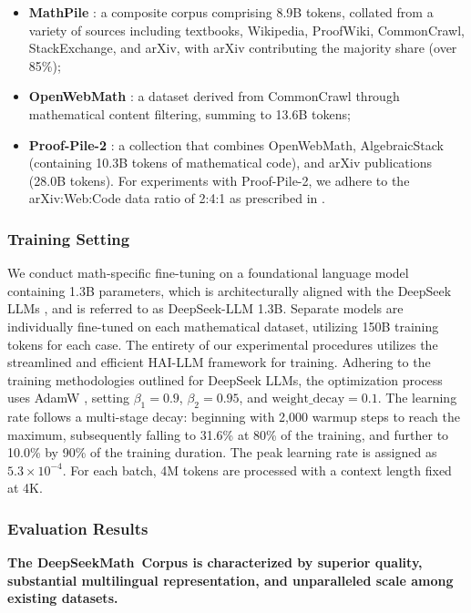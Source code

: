 \begin{itemize}[topsep=0pt]
    \item \textbf{MathPile} \citep{mathpile}: a composite corpus comprising 8.9B tokens, collated from a variety of sources including textbooks, Wikipedia, ProofWiki, CommonCrawl, StackExchange, and arXiv, with arXiv contributing the majority share (over 85\%);
    \item \textbf{OpenWebMath} \citep{openwebmath}: a dataset derived from CommonCrawl through mathematical content filtering, summing to 13.6B tokens;
    \item \textbf{Proof-Pile-2} \citep{llemma}: a collection that combines OpenWebMath, AlgebraicStack (containing 10.3B tokens of mathematical code), and arXiv publications (28.0B tokens). For experiments with Proof-Pile-2, we adhere to the arXiv:Web:Code data ratio of 2:4:1 as prescribed in \cite{llemma}.
\end{itemize}

\subsubsection{Training Setting}
\label{sec:quality-policy}
We conduct math-specific fine-tuning on a foundational language model containing 1.3B parameters, which is architecturally aligned with the DeepSeek LLMs \citep{deepseek-llm}, and is referred to as DeepSeek-LLM 1.3B. Separate models are individually fine-tuned on each mathematical dataset, utilizing 150B training tokens for each case. The entirety of our experimental procedures utilizes the streamlined and efficient HAI-LLM framework \citep{haillm} for training. Adhering to the training methodologies outlined for DeepSeek LLMs, the optimization process uses AdamW \citep{adamW}, setting $\beta_1=0.9$, $\beta_2=0.95$, and $\mathrm{weight\_decay}=0.1$. The learning rate follows a multi-stage decay: beginning with 2,000 warmup steps to reach the maximum, subsequently falling to 31.6\% at 80\% of the training, and further to 10.0\% by 90\% of the training duration. The peak learning rate is assigned as $5.3 \times 10^{-4}$. For each batch, 4M tokens are processed with a context length fixed at 4K.

\subsubsection{Evaluation Results}

\textbf{The DeepSeekMath~Corpus is characterized by superior quality, substantial multilingual representation, and unparalleled scale among existing datasets.}

